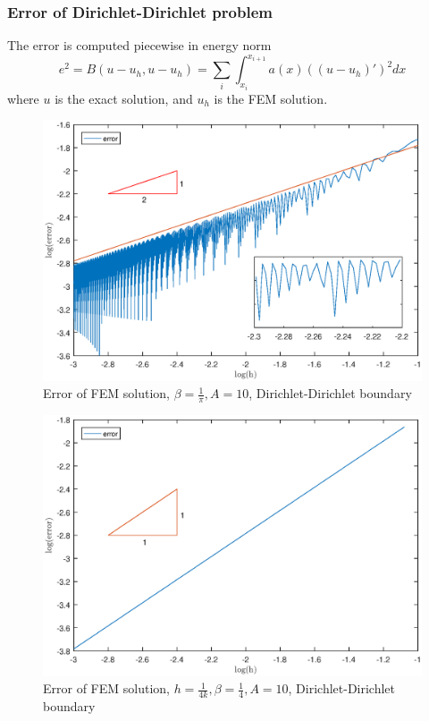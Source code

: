 \documentclass[12pt]{article}
\begin{document}
\subsubsection{Error of Dirichlet-Dirichlet problem}
The error is computed piecewise in energy norm
$$e^2=B(u-u_{h},u-u_{h})=\sum_{i}\int_{x_{i}}^{x_{i+1}}a(x)((u-u_{h})')^2dx$$
where $u$ is the exact solution, and $u_{h}$ is the FEM solution.
\begin{figure}[h!]
\centering
\includegraphics[scale=0.7]{error-pi-DD}
\caption{Error of FEM solution, $\beta=\frac{1}{\pi},A=10$, Dirichlet-Dirichlet boundary}
\label{fig-e-pi-DD}
\end{figure}

\begin{figure}[h!]
\centering
\includegraphics[scale=0.7]{error-4-DD}
\caption{Error of FEM solution, $h=\frac{1}{4k},\beta=\frac{1}{4},A=10$, Dirichlet-Dirichlet boundary}
\label{fig-e-4-DD}
\end{figure}
\end{document}
